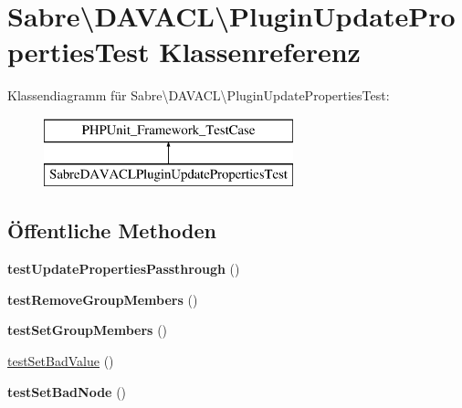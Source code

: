 \hypertarget{class_sabre_1_1_d_a_v_a_c_l_1_1_plugin_update_properties_test}{}\section{Sabre\textbackslash{}D\+A\+V\+A\+CL\textbackslash{}Plugin\+Update\+Properties\+Test Klassenreferenz}
\label{class_sabre_1_1_d_a_v_a_c_l_1_1_plugin_update_properties_test}
Klassendiagramm für Sabre\textbackslash{}D\+A\+V\+A\+CL\textbackslash{}Plugin\+Update\+Properties\+Test\+:\begin{figure}[H]
\begin{center}
\leavevmode
\includegraphics[height=2.000000cm]{class_sabre_1_1_d_a_v_a_c_l_1_1_plugin_update_properties_test}
\end{center}
\end{figure}
\subsection*{Öffentliche Methoden}
\begin{DoxyCompactItemize}
\item 
\mbox{\label{class_sabre_1_1_d_a_v_a_c_l_1_1_plugin_update_properties_test_af956ea0dff263a440eaf27d34e997ba4}} 
{\bfseries test\+Update\+Properties\+Passthrough} ()
\item 
\mbox{\label{class_sabre_1_1_d_a_v_a_c_l_1_1_plugin_update_properties_test_a93c845a7e893464cc1b0f5e1320f510d}} 
{\bfseries test\+Remove\+Group\+Members} ()
\item 
\mbox{\label{class_sabre_1_1_d_a_v_a_c_l_1_1_plugin_update_properties_test_a0410e6eb8f4db31d60fb87943643783d}} 
{\bfseries test\+Set\+Group\+Members} ()
\item 
\mbox{\hyperlink{class_sabre_1_1_d_a_v_a_c_l_1_1_plugin_update_properties_test_af74cea9e5be67819c4dba82ed3cfe8ba}{test\+Set\+Bad\+Value}} ()
\item 
\mbox{\label{class_sabre_1_1_d_a_v_a_c_l_1_1_plugin_update_properties_test_a820213bfcd3a5cb64b8cd63e2317bc4c}} 
{\bfseries test\+Set\+Bad\+Node} ()
\end{DoxyCompactItemize}



